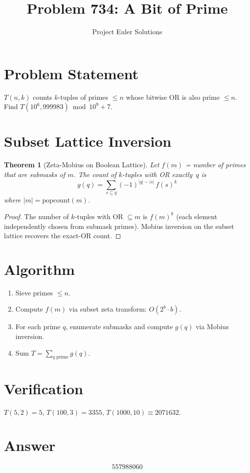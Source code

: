\documentclass[11pt]{article}
\title{Problem 734: A Bit of Prime}
\author{Project Euler Solutions}
\date{}
\newtheorem{theorem}{Theorem}
\begin{document}
\maketitle

\section{Problem Statement}
$T(n,k)$ counts $k$-tuples of primes $\le n$ whose bitwise OR is also prime $\le n$. Find $T(10^6, 999983) \bmod 10^9+7$.

\section{Subset Lattice Inversion}

\begin{theorem}[Zeta-Mobius on Boolean Lattice]
Let $f(m)$ = number of primes that are submasks of $m$. The count of $k$-tuples with OR exactly~$q$ is
\[
g(q) = \sum_{s \subseteq q} (-1)^{|q|-|s|}\, f(s)^k
\]
where $|m| = \mathrm{popcount}(m)$.
\end{theorem}

\begin{proof}
The number of $k$-tuples with OR $\subseteq m$ is $f(m)^k$ (each element independently chosen from submask primes). Mobius inversion on the subset lattice recovers the exact-OR count.
\end{proof}

\section{Algorithm}
\begin{enumerate}
\item Sieve primes $\le n$.
\item Compute $f(m)$ via subset zeta transform: $O(2^b \cdot b)$.
\item For each prime $q$, enumerate submasks and compute $g(q)$ via Mobius inversion.
\item Sum $T = \sum_{q\text{ prime}} g(q)$.
\end{enumerate}

\section{Verification}
$T(5,2) = 5$, $T(100,3) = 3355$, $T(1000,10) \equiv 2071632$.

\section{Answer}

\[
\boxed{557988060}
\]
\end{document}
